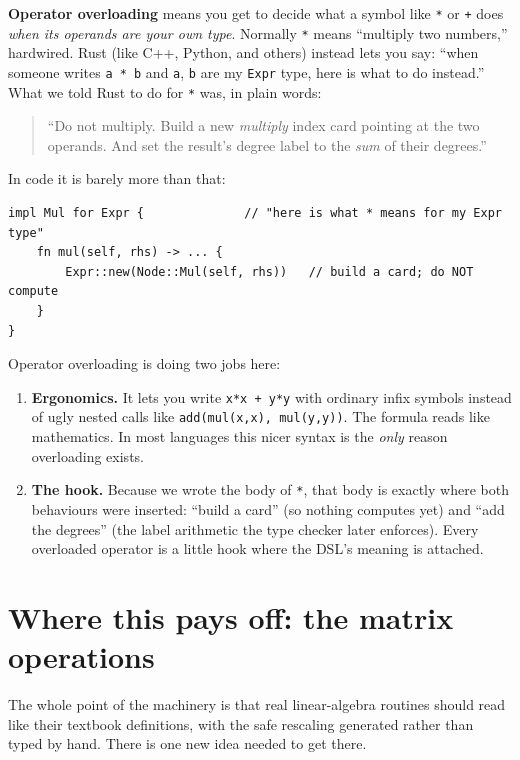 \documentclass[11pt]{article}
\newcommand{\code}[1]{\texttt{#1}}
\begin{document}
\textbf{Operator overloading} means you get to decide what a symbol like \code{*}
or \code{+} does \emph{when its operands are your own type}. Normally \code{*}
means ``multiply two numbers,'' hardwired. Rust (like C++, Python, and others)
instead lets you say: ``when someone writes \code{a * b} and \code{a}, \code{b}
are my \code{Expr} type, here is what to do instead.'' What we told Rust to do
for \code{*} was, in plain words:

\begin{quote}
``Do not multiply. Build a new \emph{multiply} index card pointing at the two
operands. And set the result's degree label to the \emph{sum} of their degrees.''
\end{quote}

In code it is barely more than that:

\begin{center}
\begin{BVerbatim}
impl Mul for Expr {              // "here is what * means for my Expr type"
    fn mul(self, rhs) -> ... {
        Expr::new(Node::Mul(self, rhs))   // build a card; do NOT compute
    }
}
\end{BVerbatim}
\end{center}

Operator overloading is doing two jobs here:

\begin{enumerate}[leftmargin=1.6em]
  \item \textbf{Ergonomics.} It lets you write \code{x*x + y*y} with ordinary
  infix symbols instead of ugly nested calls like \code{add(mul(x,x),
  mul(y,y))}. The formula reads like mathematics. In most languages this nicer
  syntax is the \emph{only} reason overloading exists.
  \item \textbf{The hook.} Because we wrote the body of \code{*}, that body is
  exactly where both behaviours were inserted: ``build a card'' (so nothing
  computes yet) and ``add the degrees'' (the label arithmetic the type checker
  later enforces). Every overloaded operator is a little hook where the DSL's
  meaning is attached.
\end{enumerate}

\section{Where this pays off: the matrix operations}

The whole point of the machinery is that real linear-algebra routines should
read like their textbook definitions, with the safe rescaling generated rather
than typed by hand. There is one new idea needed to get there.
\end{document}
